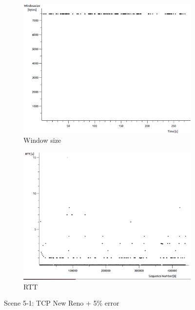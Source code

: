 \documentclass[conference,a4paper]{IEEEtran}
\begin{document}
\begin{figure}
\begin{subfigure}[b]{0.2\textwidth}
  \includegraphics[width=\textwidth]{s5-1_wsize}
  \caption{Window size}
 \end{subfigure}
 \begin{subfigure}[b]{0.2\textwidth}
  \includegraphics[width=\textwidth]{s5-1_rtt}
  \caption{RTT}
 \end{subfigure}
 \caption{Scene 5-1: TCP New Reno + 5\% error}
\end{figure}
\end{document}
